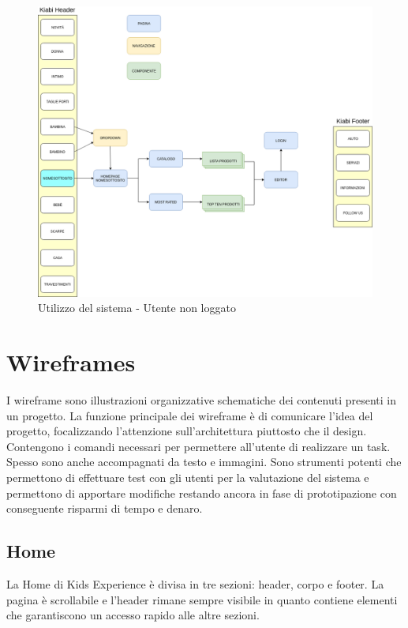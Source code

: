 \documentclass[12pt,italian,]{report}
\begin{document}
\begin{figure}[h]
\centering
\includegraphics{img/Utente_non_loggato.png}
\caption{Utilizzo del sistema - Utente non loggato}
\end{figure}

\hypertarget{wireframes}{%
\section{Wireframes}\label{wireframes}}

I wireframe sono illustrazioni organizzative schematiche dei contenuti
presenti in un progetto. La funzione principale dei wireframe è di
comunicare l'idea del progetto, focalizzando l'attenzione
sull'architettura piuttosto che il design. Contengono i comandi
necessari per permettere all'utente di realizzare un task. Spesso sono
anche accompagnati da testo e immagini. Sono strumenti potenti che
permettono di effettuare test con gli utenti per la valutazione del
sistema e permettono di apportare modifiche restando ancora in fase di
prototipazione con conseguente risparmi di tempo e denaro.

\hypertarget{home}{%
\subsection{Home}\label{home}}

La Home di Kids Experience è divisa in tre sezioni: header, corpo e
footer. La pagina è scrollabile e l'header rimane sempre visibile in
quanto contiene elementi che garantiscono un accesso rapido alle altre
sezioni.
\end{document}
